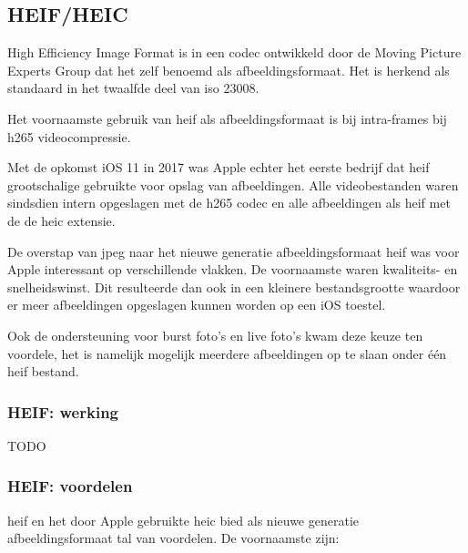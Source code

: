 \subsection{HEIF/HEIC}
\label{sec:afbeeldingscompressie-heif}

High Efficiency Image Format is in een \gls{codec} ontwikkeld door de Moving Picture Experts Group dat het zelf benoemd als \gls{afbeeldingsformaat}. Het is herkend als standaard in het twaalfde deel van \gls{iso} 23008.

Het voornaamste gebruik van \gls{heif} als \gls{afbeeldingsformaat} is bij \glspl{intra-frame} bij \gls{h265} \gls{videocompressie}.

Met de opkomst iOS 11 in 2017 was Apple echter het eerste bedrijf dat \gls{heif} grootschalige gebruikte voor opslag van afbeeldingen. Alle videobestanden waren sindsdien intern opgeslagen met de \gls{h265} \gls{codec} en alle afbeeldingen als \gls{heif} met de de \gls{heic} \gls{extensie}. 

De overstap van \gls{jpeg} naar het nieuwe generatie \gls{afbeeldingsformaat} \gls{heif} was voor Apple interessant op verschillende vlakken. De voornaamste waren kwaliteits- en snelheidswinst. Dit resulteerde dan ook in een kleinere bestandsgrootte waardoor er meer afbeeldingen opgeslagen kunnen worden op een iOS toestel.

Ook de ondersteuning voor burst foto's en live foto's kwam deze keuze ten voordele, het is namelijk mogelijk meerdere afbeeldingen op te slaan onder één \gls{heif} bestand.

\subsubsection{HEIF: werking}
\label{sec:afbeeldingscompressie-heif-werking}

TODO


\subsubsection{HEIF: voordelen}
\label{sec:afbeeldingscompressie-heif-voordelen}

\Gls{heif} en het door Apple gebruikte \gls{heic} bied als nieuwe generatie \gls{afbeeldingsformaat} tal van voordelen. De voornaamste zijn: 

